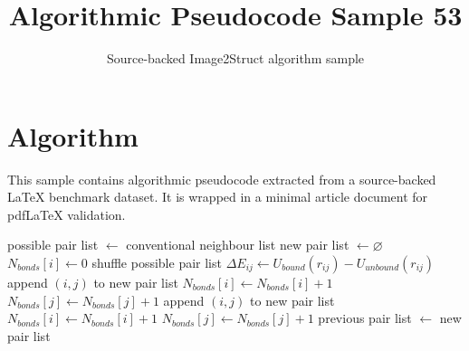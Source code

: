 \documentclass[11pt]{article}
\title{Algorithmic Pseudocode Sample 53}
\author{Source-backed Image2Struct algorithm sample}
\date{}
\begin{document}
\maketitle
\section{Algorithm}
This sample contains algorithmic pseudocode extracted from a source-backed LaTeX benchmark dataset. It is wrapped in a minimal article document for pdfLaTeX validation.

\begin{algorithm}[htbp]
\caption{Source-backed algorithmic procedure}
\begin{algorithmic}[1]
\State possible pair list $\gets$ conventional neighbour list
\State new pair list $\gets \varnothing$
\State $N_{bonds}[i]\gets0$
\EndFor
\State shuffle possible pair list
\State $\Delta E_{ij} \gets U_{bound}(r_{ij})-U_{unbound}(r_{ij})$
\State append $(i,j)$ to new pair list
\State $N_{bonds}[i]\gets N_{bonds}[i]+1$
\State $N_{bonds}[j]\gets N_{bonds}[j]+1$
\EndIf
{}
\State append $(i,j)$ to new pair list
\State $N_{bonds}[i]\gets N_{bonds}[i]+1$
\State $N_{bonds}[j]\gets N_{bonds}[j]+1$
\EndIf
\EndIf
\EndFor
\State previous pair list $\gets$ new pair list
\end{algorithmic}
\end{algorithm}
\end{document}
